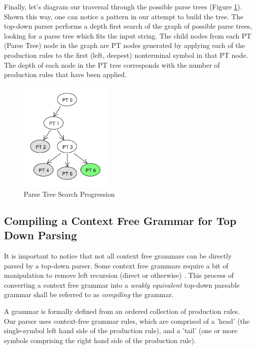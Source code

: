\documentclass[11pt]{article}
\begin{document}
Finally, let's diagram our traversal through the possible parse trees (Figure \ref{fig:rdp_7}). Shown this way, one can notice
a pattern in our attempt to build the tree. The top-down parser performs a depth first search of the 
graph of possible parse trees, looking for a parse tree which fits the input string.
The child nodes from each PT (Parse Tree) node in the graph are PT nodes generated by
applying each of the production rules to the first (left, deepest) nonterminal symbol in that PT node.
The depth of each node in the PT tree corresponds with the number of production rules that have been applied.

\begin{figure}[h!]
    \centering
    \includegraphics[width=0.4\textwidth,natwidth=30,natheight=30]{umlet/rdp_7.pdf}
    \caption{Parse Tree Search Progression}
    \label{fig:rdp_7}
\end{figure}

\clearpage

\subsection{Compiling a Context Free Grammar for Top Down Parsing}

It is important to notice that not all context free grammars can be directly parsed by a
top-down parser. Some context free grammars require a bit of manipulation to remove
left recursion (direct or otherwise) \cite{compiler}. This process of converting a context
free grammar into a {\em weakly equivalent} top-down parsable grammar shall be referred to as
{\em compiling} the grammar.

A grammar is formally defined from an ordered collection of production rules.
Our parser uses context-free grammar rules, which are comprised of a
'head' (the single-symbol left hand side of the production rule), and a 'tail'
(one or more symbols comprising the right hand side of the production rule).
\end{document}
